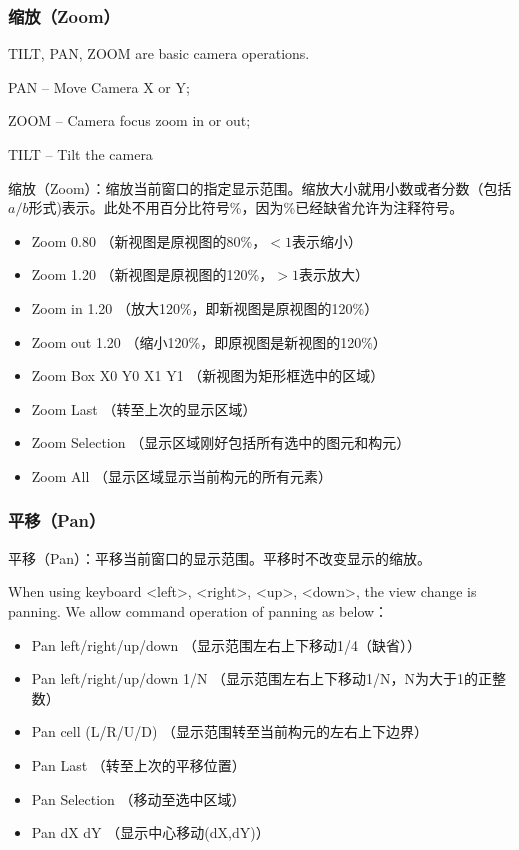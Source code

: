 \subsubsection{缩放（Zoom）} \label{SectCmdViewZoom}
TILT, PAN, ZOOM are basic camera operations.

PAN -- Move Camera X or Y;

ZOOM -- Camera focus zoom in or out;

TILT -- Tilt the camera 

缩放（Zoom）：缩放当前窗口的指定显示范围。缩放大小就用小数或者分数（包括$a/b$形式)表示。此处不用百分比符号\%，因为\%已经缺省允许为注释符号。
\begin{itemize}
	\item Zoom 0.80  （新视图是原视图的80\%，$<1$表示缩小）
	\item Zoom 1.20  （新视图是原视图的120\%，$>1$表示放大）
	\item Zoom in 1.20  （放大120\%，即新视图是原视图的120\%）
	\item Zoom out 1.20 （缩小120\%，即原视图是新视图的120\%）
	\item Zoom Box X0 Y0 X1 Y1  （新视图为矩形框选中的区域）
	\item Zoom Last  （转至上次的显示区域）
	\item Zoom Selection  （显示区域刚好包括所有选中的图元和构元）
	\item Zoom All  （显示区域显示当前构元的所有元素）
\end{itemize}

\subsubsection{平移（Pan）} \label{SectCmdViewPan}
平移（Pan）：平移当前窗口的显示范围。平移时不改变显示的缩放。

When using keyboard <left>, <right>, <up>, <down>, the view change is panning. We allow command operation of panning as below：
\begin{itemize}
	\item Pan left/right/up/down  （显示范围左右上下移动1/4（缺省））
	\item Pan left/right/up/down 1/N （显示范围左右上下移动1/N，N为大于1的正整数）
	\item Pan cell (L/R/U/D)  （显示范围转至当前构元的左右上下边界）
	\item Pan Last  （转至上次的平移位置）
	\item Pan Selection  （移动至选中区域）
	\item Pan dX dY （显示中心移动(dX,dY)）
\end{itemize}

